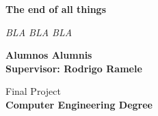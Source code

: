 
\begin{titlepage}
	
	
	\thispagestyle{frontpage}
	
	\begin{center}
		
		\vspace*{6\baselineskip}
	
		
		{\Huge \textbf{The end of all things\\}}
		
		\large{\textit{BLA BLA BLA}}\\
		
        \vspace*{1,5\baselineskip}

		\large{\textbf{Alumnos Alumnis}}\\
		\large{\textbf{Supervisor: Rodrigo Ramele}}\\
		
		\vspace{1,5\baselineskip}
		
		\large{Final Project}\\
		\large{\textbf{Computer Engineering Degree}}\\
		
		\vspace{1,5\baselineskip}

	\end{center}
	
	\vspace*{6\baselineskip}
	
	
\end{titlepage}
